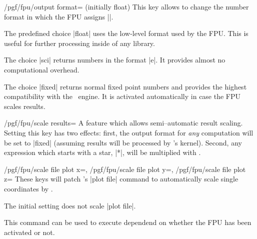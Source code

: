 \begin{key}{/pgf/fpu/output format= (initially float)}
	This key allows to change the number format in which the FPU assigns |\pgfmathresult|.

	The predefined choice |float| uses the low-level format used by the FPU. This is useful for further processing inside of any library.
\begin{codeexample}[]
\pgfmathresult
\end{codeexample}

	The choice |sci| returns numbers in the format |e|. It provides almost no computational overhead.
\begin{codeexample}[]
\pgfmathresult
\end{codeexample}

	The choice |fixed| returns normal fixed point numbers and provides the highest compatibility with the \pgfname\ engine. It is activated automatically in case the FPU scales results.
\begin{codeexample}[]
\pgfmathresult
\end{codeexample}
\end{key}

\begin{key}{/pgf/fpu/scale results=}
	A feature which allows semi--automatic result scaling. Setting this key has two effects: first, the output format for \emph{any} computation will be set to |fixed| (assuming results will be processed by \pgfname's kernel). Second, any expression which starts with a star, |*|, will be multiplied with .
\end{key}

\begin{keylist}{
	/pgf/fpu/scale file plot x=,%
	/pgf/fpu/scale file plot y=,%
	/pgf/fpu/scale file plot z=}%
	These keys will patch \pgfname's |plot file| command to automatically scale single coordinates by .

	The initial setting does not scale |plot file|.
\end{keylist}

\begin{command}{\pgflibraryfpuifactive{}}
	This command can be used to execute dependend on whether the FPU has been activated or not.
\end{command}

